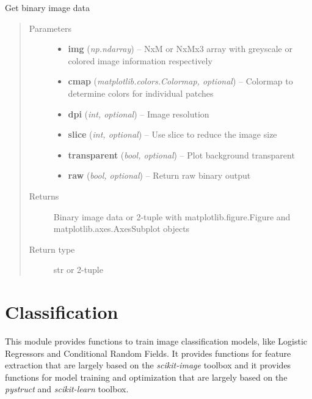 \documentclass[letterpaper,10pt,english]{sphinxmanual}
\begin{document}
\begin{fulllineitems}
\label{flamingo/segmentation/index:flamingo.segmentation.plot.plot_image}
Get binary image data
\begin{quote}\begin{description}
\item[{Parameters}] \leavevmode\begin{itemize}
\item {} 
\textbf{img} (\emph{np.ndarray}) -- NxM or NxMx3 array with greyscale or colored image information
respectively

\item {} 
\textbf{cmap} (\emph{matplotlib.colors.Colormap, optional}) -- Colormap to determine colors for individual patches

\item {} 
\textbf{dpi} (\emph{int, optional}) -- Image resolution

\item {} 
\textbf{slice} (\emph{int, optional}) -- Use slice to reduce the image size

\item {} 
\textbf{transparent} (\emph{bool, optional}) -- Plot background transparent

\item {} 
\textbf{raw} (\emph{bool, optional}) -- Return raw binary output

\end{itemize}

\item[{Returns}] \leavevmode
Binary image data or 2-tuple with matplotlib.figure.Figure and
matplotlib.axes.AxesSubplot objects

\item[{Return type}] \leavevmode
str or 2-tuple

\end{description}\end{quote}

\end{fulllineitems}



\section{Classification}
\label{flamingo/classification/index::doc}\label{flamingo/classification/index:classification}
This module provides functions to train image classification models, like Logistic Regressors and Conditional Random Fields.
It provides functions for feature extraction that are largely based on the \emph{scikit-image} toolbox and
it provides functions for model training and optimization that are largely based on the \emph{pystruct} and \emph{scikit-learn} toolbox.
\end{document}
